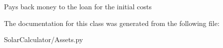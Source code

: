 \begin{DoxyVerb}Pays back money to the loan for the initial costs \end{DoxyVerb}
 

The documentation for this class was generated from the following file\-:\begin{DoxyCompactItemize}
\item 
Solar\-Calculator/Assets.\-py\end{DoxyCompactItemize}
